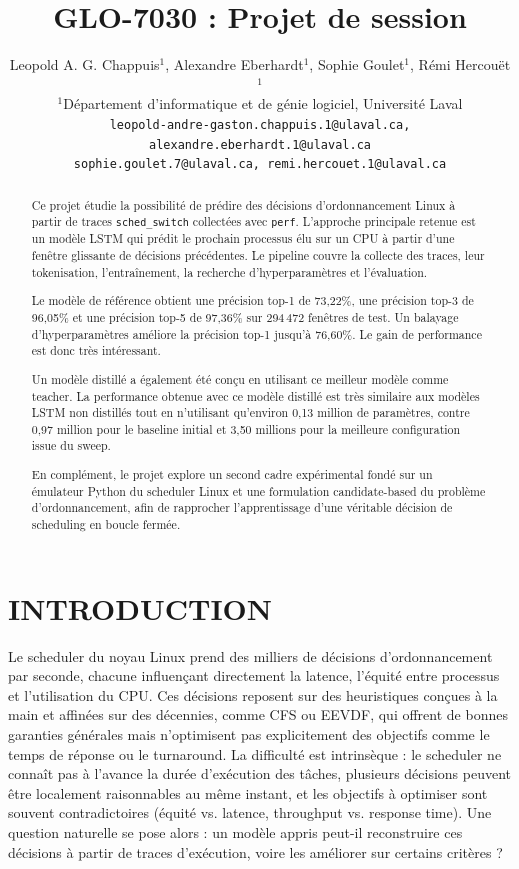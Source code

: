 \documentclass[letterpaper, 10 pt, conference]{ieeeconf}  %
\title{\LARGE \bf
GLO-7030 : Projet de session
}
\author{Leopold A. G. Chappuis$^{1}$, Alexandre Eberhardt$^{1}$, Sophie Goulet$^{1}$, Rémi Hercouët$^{1}$\\
\vspace{0.25em}
{\small $^{1}$Département d'informatique et de génie logiciel, Université Laval}\\
{\tt\small leopold-andre-gaston.chappuis.1@ulaval.ca, alexandre.eberhardt.1@ulaval.ca}\\
{\tt\small sophie.goulet.7@ulaval.ca, remi.hercouet.1@ulaval.ca}\\
}
\begin{document}
\maketitle
\thispagestyle{empty}
\pagestyle{empty}

\begin{abstract}
Ce projet étudie la possibilité de prédire des décisions d'ordonnancement Linux à partir de traces \texttt{sched\_switch} collectées avec \texttt{perf}. L'approche principale retenue est un modèle LSTM qui prédit le prochain processus élu sur un CPU à partir d'une fenêtre glissante de décisions précédentes. Le pipeline couvre la collecte des traces, leur tokenisation, l'entraînement, la recherche d'hyperparamètres et l'évaluation.

Le modèle de référence obtient une précision top-1 de \mbox{73,22\%}, une précision top-3 de \mbox{96,05\%} et une précision top-5 de \mbox{97,36\%} sur 294\,472 fenêtres de test. Un balayage d'hyperparamètres améliore la précision top-1 jusqu'à \mbox{76,60\%}. Le gain de performance est donc très intéressant.

Un modèle distillé a également été conçu en utilisant ce meilleur modèle comme teacher. La performance obtenue avec ce modèle distillé est très similaire aux modèles LSTM non distillés tout en n'utilisant qu'environ 0,13 million de paramètres, contre 0,97 million pour le baseline initial et 3,50 millions pour la meilleure configuration issue du sweep.

En complément, le projet explore un second cadre expérimental fondé sur un émulateur Python du scheduler Linux et une formulation candidate-based du problème d'ordonnancement, afin de rapprocher l'apprentissage d'une véritable décision de scheduling en boucle fermée.
\end{abstract}


\section{INTRODUCTION}
Le scheduler du noyau Linux prend des milliers de décisions 
d'ordonnancement par seconde, chacune influençant directement 
la latence, l'équité entre processus et l'utilisation du CPU. 
Ces décisions reposent sur des heuristiques conçues à la main 
et affinées sur des décennies, comme CFS ou EEVDF, qui offrent 
de bonnes garanties générales mais n'optimisent pas explicitement 
des objectifs comme le temps de réponse ou le turnaround. 
La difficulté est intrinsèque : le scheduler ne connaît pas à 
l'avance la durée d'exécution des tâches, plusieurs décisions 
peuvent être localement raisonnables au même instant, et les 
objectifs à optimiser sont souvent contradictoires (équité 
vs. latence, throughput vs. response time). Une question 
naturelle se pose alors : un modèle appris peut-il 
reconstruire ces décisions à partir de traces d'exécution, 
voire les améliorer sur certains critères ?
\end{document}
